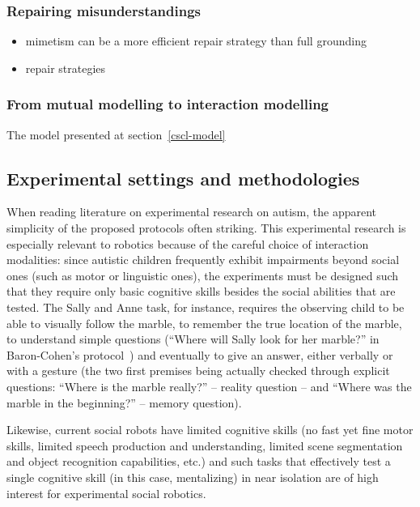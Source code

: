 \documentclass{sig-alternate}
\begin{document}
\subsubsection{Repairing misunderstandings}

\begin{itemize}
    \item mimetism can be a more efficient repair strategy than full grounding
    \item repair strategies
\end{itemize}

\subsubsection{From mutual modelling to interaction modelling}

The model presented at section~\ref{cscl-model}

\subsection{Experimental settings and methodologies}
\label{robotics-experiments}

When reading literature on experimental research on autism, the apparent
simplicity of the proposed protocols often striking. This experimental research
is especially relevant to robotics because of the careful choice of interaction
modalities: since autistic children frequently exhibit impairments beyond social
ones (such as motor or linguistic ones), the experiments must be designed such
that they require only basic cognitive skills besides the social abilities that
are tested. The Sally and Anne task, for instance, requires the observing child
to be able to visually follow the marble, to remember the true location of the
marble, to understand simple questions (``Where will Sally look for her
marble?'' in Baron-Cohen's protocol~\cite{baron1985does}) and eventually to give
an answer, either verbally or with a gesture (the two first premises being
actually checked through explicit questions: ``Where is the
marble really?'' -- reality question -- and ``Where was the marble in the
beginning?'' -- memory question).

Likewise, current social robots have limited cognitive skills (no fast yet fine
motor skills, limited speech production and understanding, limited scene
segmentation and object recognition capabilities, etc.) and such tasks
that effectively test a single cognitive skill (in this case, mentalizing) in
near isolation are of high interest for experimental social robotics.
\end{document}
